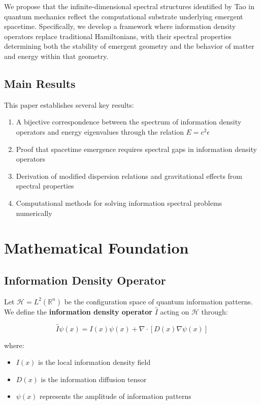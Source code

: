 \documentclass[12pt]{article}
\begin{document}
We propose that the infinite-dimensional spectral structures identified by Tao in quantum mechanics reflect the computational substrate underlying emergent spacetime. Specifically, we develop a framework where information density operators replace traditional Hamiltonians, with their spectral properties determining both the stability of emergent geometry and the behavior of matter and energy within that geometry.

\subsection{Main Results}

This paper establishes several key results:

\begin{enumerate}
\item A bijective correspondence between the spectrum of information density operators and energy eigenvalues through the relation $E = c^2\epsilon$
\item Proof that spacetime emergence requires spectral gaps in information density operators
\item Derivation of modified dispersion relations and gravitational effects from spectral properties
\item Computational methods for solving information spectral problems numerically
\end{enumerate}

\section{Mathematical Foundation}

\subsection{Information Density Operator}

Let $\mathcal{H} = L^2(\mathbb{R}^n)$ be the configuration space of quantum information patterns. We define the \textbf{information density operator} $\hat{I}$ acting on $\mathcal{H}$ through:

\begin{equation}
\hat{I}\psi(x) = I(x)\psi(x) + \nabla \cdot [D(x)\nabla \psi(x)]
\end{equation}

where:
\begin{itemize}
\item $I(x)$ is the local information density field
\item $D(x)$ is the information diffusion tensor
\item $\psi(x)$ represents the amplitude of information patterns
\end{itemize}
\end{document}
